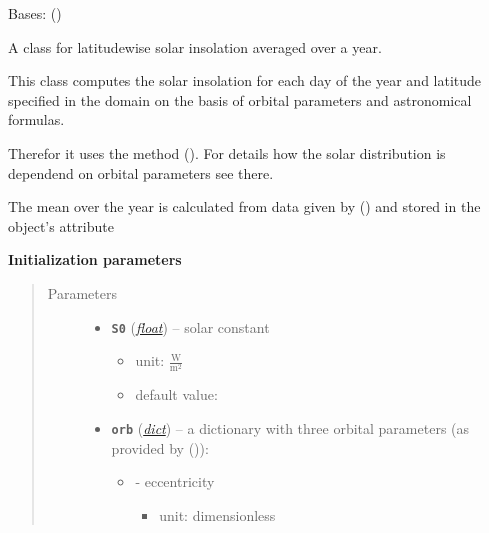 \documentclass[a4paper,10pt,english]{sphinxmanual}
\begin{document}
\begin{fulllineitems}
\label{api/climlab.radiation:climlab.radiation.insolation.AnnualMeanInsolation}
Bases: {\hyperref[api/climlab.radiation:climlab.radiation.insolation._Insolation]{\emph{}}} ()

A class for latitudewise solar insolation averaged over a year.

This class computes the solar insolation for each day of the year and 
latitude specified in the domain on the basis of orbital parameters and 
astronomical formulas.

Therefor it uses the method {\hyperref[api/climlab.solar:climlab.solar.insolation.daily_insolation]{\emph{}}} ().
For details how the solar distribution is dependend on orbital parameters 
see there.

The mean over the year is calculated from data given by
{\hyperref[api/climlab.solar:climlab.solar.insolation.daily_insolation]{\emph{}}} () and stored in the 
object's attribute 

\textbf{Initialization parameters}
\begin{quote}\begin{description}
\item[{Parameters}] \leavevmode\begin{itemize}
\item {} 
\textbf{\texttt{S0}} (\href{http://docs.python.org/2.7/library/functions.html\#float}{\emph{float}}) -- 
solar constant
\begin{itemize}
\item {} 
unit: \(\frac{\textrm{W}}{\textrm{m}^2}\)

\item {} 
default value: 

\end{itemize}


\item {} 
\textbf{\texttt{orb}} (\href{http://docs.python.org/2.7/library/stdtypes.html\#dict}{\emph{dict}}) -- 
a dictionary with three orbital parameters (as provided by 
{\hyperref[api/climlab.solar:climlab.solar.orbital.OrbitalTable]{\emph{}}} ()):
\begin{itemize}
\item {} 
 - eccentricity
\begin{itemize}
\item {} 
unit: dimensionless


\end{itemize}
\end{itemize}
\end{itemize}
\end{description}
\end{quote}
\end{fulllineitems}
\end{document}

